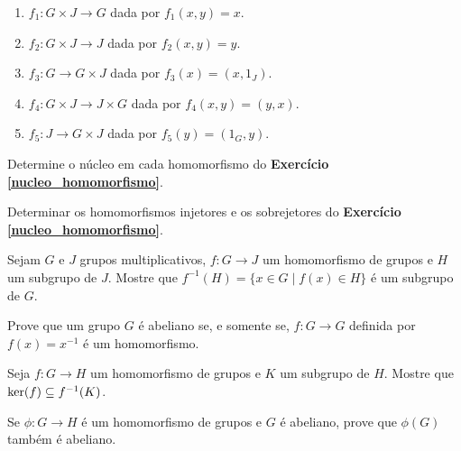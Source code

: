 \documentclass[12pt]{exam}
\begin{document}
    \begin{enumerate}[label=({\alph*})]
        \item $f_1 : G \times J \to G$ dada por $f_1(x,y) = x$.

        \item $f_2 : G \times J \to J$ dada por $f_2(x,y) = y$.

        \item $f_3 : G  \to G \times J$ dada por $f_3(x) = (x, 1_J)$.

        \item $f_4 : G \times J \to J \times G$ dada por $f_4(x,y) = (y, x)$.

        \item $f_5 : J \to G \times J$ dada por $f_5(y) = (1_G, y)$.
    \end{enumerate}

    \vspace{.3cm}

    \questao{} Determine o núcleo em cada homomorfismo do \textbf{Exercício \ref{nucleo_homomorfismo}}.

    \vspace{.3cm}

    \questao{} Determinar os homomorfismos injetores e os sobrejetores do \textbf{Exercício \ref{nucleo_homomorfismo}}.

    \vspace{.3cm}

    \questao{} Sejam $G$ e $J$ grupos multiplicativos, $f : G \to J$ um homomorfismo de grupos e $H$ um subgrupo de $J$. Mostre que $f^{-1}(H) = \{ x \in G \mid f(x) \in H\}$ é um subgrupo de $G$.

    \vspace{.3cm}

    \questao{} Prove que um grupo $G$ é abeliano se, e somente se, $f : G \to G$ definida por $f(x) = x^{-1}$ é um homomorfismo.

    \vspace{.3cm}

    \questao{} Seja $f: G\to H$ um homomorfismo de grupos e $K$ um subgrupo de $H$. Mostre que $\ker(f)\subseteq f^{-1}(K)$.

    \vspace{.3cm}

    \questao{} Se $\phi : G \to H$ é um homomorfismo de grupos e $G$ é abeliano, prove que $\phi(G)$ também é abeliano.

    \vspace{.3cm}
\end{document}
